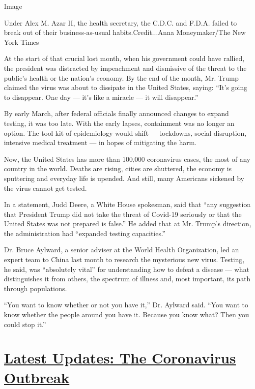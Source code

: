 Image

Under Alex M. Azar II, the health secretary, the C.D.C. and F.D.A.
failed to break out of their business-as-usual habits.Credit...Anna
Moneymaker/The New York Times

At the start of that crucial lost month, when his government could have
rallied, the president was distracted by impeachment and dismissive of
the threat to the public's health or the nation's economy. By the end of
the month, Mr. Trump claimed the virus was about to dissipate in the
United States, saying: ``It's going to disappear. One day --- it's like
a miracle --- it will disappear.''

By early March, after federal officials finally announced changes to
expand testing, it was too late. With the early lapses, containment was
no longer an option. The tool kit of epidemiology would shift ---
lockdowns, social disruption, intensive medical treatment --- in hopes
of mitigating the harm.

Now, the United States has more than 100,000 coronavirus cases, the most
of any country in the world. Deaths are rising, cities are shuttered,
the economy is sputtering and everyday life is upended. And still, many
Americans sickened by the virus cannot get tested.

In a statement, Judd Deere, a White House spokesman, said that ``any
suggestion that President Trump did not take the threat of Covid-19
seriously or that the United States was not prepared is false.'' He
added that at Mr. Trump's direction, the administration had ``expanded
testing capacities.''

Dr. Bruce Aylward, a senior adviser at the World Health Organization,
led an expert team to China last month to research the mysterious new
virus. Testing, he said, was ``absolutely vital'' for understanding how
to defeat a disease --- what distinguishes it from others, the spectrum
of illness and, most important, its path through populations.

``You want to know whether or not you have it,'' Dr. Aylward said. ``You
want to know whether the people around you have it. Because you know
what? Then you could stop it.''

\hypertarget{latest-updates-the-coronavirus-outbreak}{%
\section{\texorpdfstring{\href{https://www.nytimes3xbfgragh.onion/2020/09/11/world/covid-19-coronavirus.html?action=click\&pgtype=Article\&state=default\&region=MAIN_CONTENT_1\&context=storylines_live_updates}{Latest
Updates: The Coronavirus
Outbreak}}{Latest Updates: The Coronavirus Outbreak}}\label{latest-updates-the-coronavirus-outbreak}}

